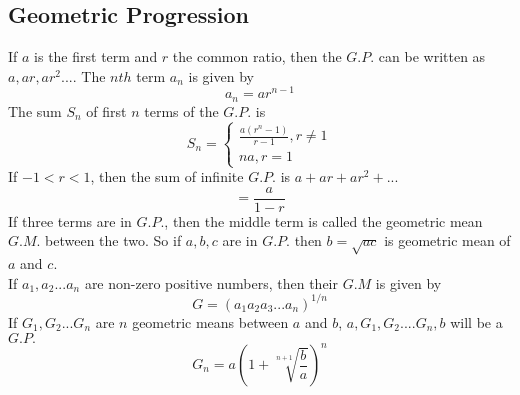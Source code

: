 \documentclass[12pt]{article}
\begin{document}
\subsection{Geometric Progression}
If $a$ is the first term and $r$ the common ratio, then the $G.P.$ can be written as $a,ar,ar^2...$. The $nth$ term $a_n$ is given by 
$$a_n=ar^{n-1}$$ The sum $S_n$ of first $n$ terms of the $G.P.$ is 
$$S_n=
\begin{cases}
  \frac{a(r^n -1)}{r-1}, r \not= 1 \\
   na,r=1\
\end{cases} $$ If $-1<r<1$, then the sum of infinite $G.P.$ is $a+ar+ar^2+...$ $$=\frac{a}{1-r}$$
If three terms are in $G.P.$, then the middle term is called the geometric mean $G.M.$ between the two. So if $a,b,c$ are in $G.P.$ then  $b=\sqrt{ac}$ is geometric mean of $a$ and $c$.\\
If $a_1,a_2...a_n$ are non-zero positive numbers, then their $G.M$ is given by $$G=(a_1a_2a_3...a_n)^{1/n}$$
If $G_1,G_2...G_n$ are $n$ geometric means between $a$ and $b$, $a,G_1,G_2....G_n,b$ will be a $G.P.$ $$G_n=a(1+ \sqrt[n+1]{\frac{b}{a}})^{n}$$
\end{document}
